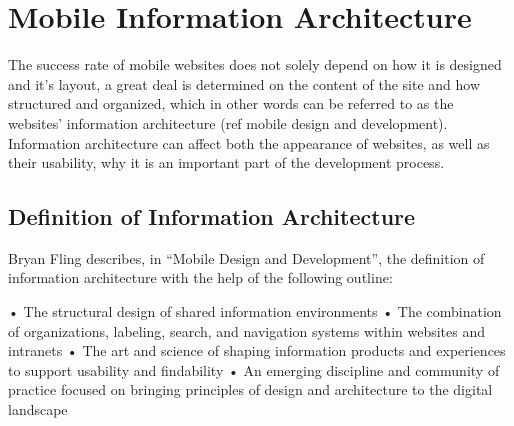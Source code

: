 \section{Mobile Information Architecture}

The success rate of mobile websites does not solely depend on how it is designed and it’s layout, a great deal is determined on the content of the site and how structured and organized, which in other words can be referred to as the websites’ information architecture (ref mobile design and development). Information architecture can affect both the appearance of websites, as well as their usability, why it is an important part of the development process.

\subsection{Definition of Information Architecture}

Bryan Fling describes, in “Mobile Design and Development”, the definition of information architecture with the help of the following outline:

•	The structural design of shared information environments
•	The combination of organizations, labeling, search, and navigation systems within websites and intranets
•	The art and science of shaping information products and experiences to support usability and findability
•	An emerging discipline and community of practice focused on bringing principles of design and architecture to the digital landscape
